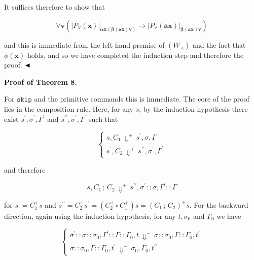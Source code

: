 It suffices therefore to show that\par
  
\par  \quad  \[\forall\bm{v}\left(|{P_{\forall}(\bm{x})}|_{\bm{\alpha}\bm{x}(\bm{\beta}(\bm{a}\bm{x})\bm{v})}\to|{P_{\forall}(\bm{a}\bm{x})}|_{\bm{\beta}(\bm{a}\bm{x})\bm{v}}\right)\]\quad  \quad  
  
and this is immediate from the left hand premise of $(W_{\prec})$ and the fact that $\phi(\bm{x})$ holds, and so we have completed the induction step and therefore the proof. $\hfill\blacktriangleleft$\par
 
 
 
 
\par\medskip\noindent\textbf{Proof of Theorem 8.}\par
 
 
For $\mathtt{skip}$ and the primitive commands this is immediate. The core of the proof lies in the composition rule. Here, for any $s$, by the induction hypothesis there exist $s^{\prime},\sigma^{\prime},\Gamma^{\prime}$ and $s^{\prime\prime},\sigma^{\prime},\Gamma^{\prime}$ such that\par
  
\par  \quad  \[\begin{cases}{s},{C_{1}}\,{\Downarrow^{+}}\,{s^{\prime}},{\sigma},{\Gamma}\\
{s^{\prime}},{C_{2}}\,{\Downarrow^{+}}\,{s^{\prime\prime}},{\sigma^{\prime}},{\Gamma^{\prime}}\end{cases}\]\quad  \quad  
  
and therefore\par
  
\par  \quad  \[{s},{{C_{1}}\,;\,{C_{2}}}\,{\Downarrow^{+}}\,{s^{\prime\prime}},{\sigma^{\prime}::\sigma},{\Gamma^{\prime}::\Gamma}\]\quad  \quad  
  
for $s^{\prime}=C_{1}^{+}s$ and $s^{\prime\prime}=C_{2}^{+}s^{\prime}=(C_{2}^{+}\circ C^{+}_{1})s=({C_{1}}\,;\,{C_{2}})^{+}s$. For the backward direction, again using the induction hypothesis, for any $t,\sigma_{0}$ and $\Gamma_{0}$ we have\par
  
\par  \quad  \[\begin{cases}{\sigma^{\prime}::\sigma::\sigma_{0}},{\Gamma^{\prime}::\Gamma::\Gamma_{0}},{t}\,{\Downarrow^{-}}\,{\sigma::\sigma_{0}},{\Gamma::\Gamma_{0}},{t^{\prime}}\\
{\sigma::\sigma_{0}},{\Gamma::\Gamma_{0}},{t^{\prime}}\,{\Downarrow^{-}}\,{\sigma_{0}},{\Gamma_{0}},{t^{\prime\prime}}\end{cases}\]\quad  \quad  
  
